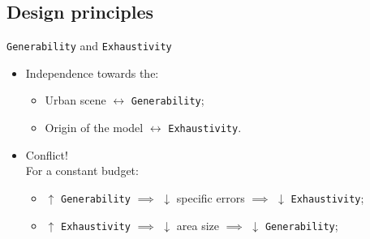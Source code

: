 \documentclass[10pt]{beamer}
\begin{document}
        \subsection{Design principles}
            \begin{frame}{\texttt{Generability} and \texttt{Exhaustivity}}
                \begin{itemize}[label=\(\blacktriangleright\), font=\color{IGNGreen}, itemsep=2em]
                    \item<1-> Independence towards the:
                        \begin{itemize}[label=\(\blacktriangleright\), font=\color{IGNGreen}, itemsep=2em]
                            \item<2-> Urban scene \(\leftrightarrow\) \texttt{Generability};
                            \item<3-> Origin of the model \(\leftrightarrow\) \texttt{Exhaustivity}.
                        \end{itemize}
                    \item<4-> Conflict!\\For a constant budget:
                        \begin{itemize}[label=\(\blacktriangleright\), font=\color{IGNGreen}, itemsep=2em]
                            \item<5-> \(\uparrow\) \texttt{Generability} \(\implies\) \(\downarrow\) specific errors \(\implies\) \(\downarrow\) \texttt{Exhaustivity};
                            \item<6-> \(\uparrow\) \texttt{Exhaustivity} \(\implies\) \(\downarrow\) area size \(\implies\) \(\downarrow\) \texttt{Generability};
                        \end{itemize}
                \end{itemize}
            \end{frame}
\end{document}
